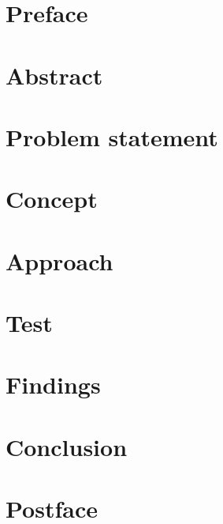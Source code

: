 \documentclass[a4paper,10pt,titlepage,twocolumn]{report}
\begin{document}

\newpage


\newpage
{}

\newcommand{\todo}[1]{\textbf{\textsc{\textcolor{red}{[#1]}}}}

\chapter*{Preface}

\label{preface}

\chapter*{Abstract}

\label{abstract}

\chapter*{Problem statement}
\label{problem}


\chapter*{Concept}
\label{concept}


\chapter*{Approach}
\label{approach}


\chapter*{Test}
\label{test}


\chapter*{Findings}
\label{findings}


\chapter*{Conclusion}
\label{conclusion}


\chapter*{Postface}
\label{postface}


\printbibliography
\end{document}
